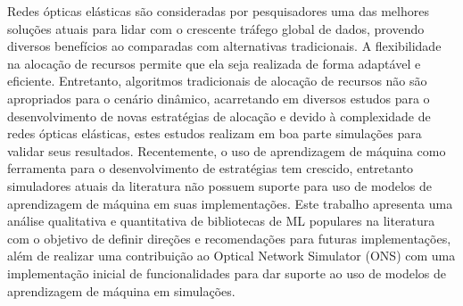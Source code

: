 Redes ópticas elásticas são consideradas por pesquisadores uma das melhores soluções atuais para lidar com o crescente tráfego global de dados, provendo diversos benefícios ao comparadas com alternativas tradicionais. A flexibilidade na alocação de recursos permite que ela seja realizada de forma adaptável e eficiente. Entretanto, algoritmos tradicionais de alocação de recursos não são apropriados para o cenário dinâmico, acarretando em diversos estudos para o desenvolvimento de novas estratégias de alocação e devido à complexidade de redes ópticas elásticas, estes estudos realizam em boa parte simulações para validar seus resultados. Recentemente, o uso de aprendizagem de máquina como ferramenta para o desenvolvimento de estratégias tem crescido, entretanto simuladores atuais da literatura não possuem suporte para uso de modelos de aprendizagem de máquina em suas implementações. Este trabalho apresenta uma análise qualitativa e quantitativa de bibliotecas de ML populares na literatura com o objetivo de definir direções e recomendações para futuras implementações, além de realizar uma contribuição ao Optical Network Simulator (ONS) com uma implementação inicial de funcionalidades para dar suporte ao uso de modelos de aprendizagem de máquina em simulações.